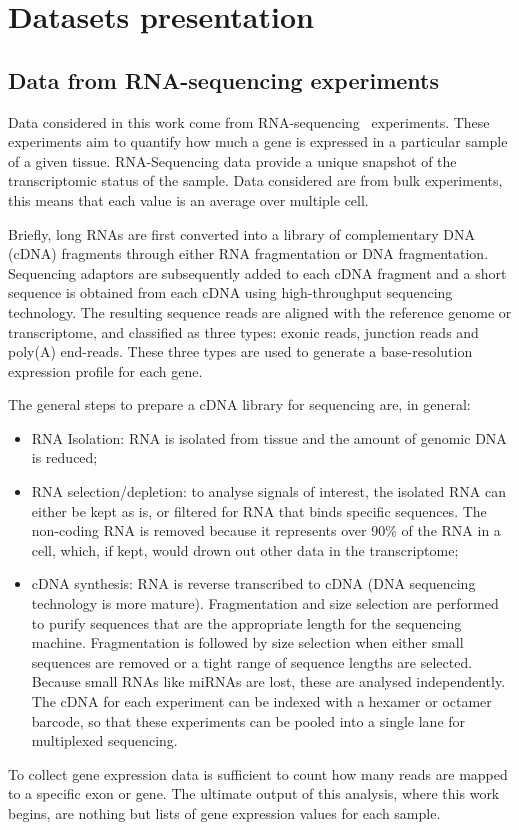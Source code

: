 \chapter{Datasets presentation}\label{ch:data}
\section{Data from RNA-sequencing experiments}\label{sec:rnaseq}
Data considered in this work come from RNA-sequencing~\cite{wang2009rna} experiments. These experiments aim to quantify how much a gene is expressed in a particular sample of a given tissue. RNA-Sequencing data provide a unique snapshot of the transcriptomic status of the sample. Data considered are from bulk experiments, this means that each value is an average over multiple cell.

Briefly, long RNAs are first converted into a library of complementary DNA (cDNA) fragments through either RNA fragmentation or DNA fragmentation. Sequencing adaptors are subsequently added to each cDNA fragment and a short sequence is obtained from each cDNA using high-throughput sequencing technology. The resulting sequence reads are aligned with the reference genome or transcriptome, and classified as three types: exonic reads, junction reads and poly(A) end-reads. These three types are used to generate a base-resolution expression profile for each gene.

The general steps to prepare a cDNA library for sequencing are, in general:
\begin{itemize}
\item RNA Isolation: RNA is isolated from tissue and the amount of genomic DNA is reduced;
\item RNA selection/depletion: to analyse signals of interest, the isolated RNA can either be kept as is, or filtered for RNA that binds specific sequences. The non-coding RNA is removed because it represents over 90$\%$ of the RNA in a cell, which, if kept, would drown out other data in the transcriptome;
\item cDNA synthesis: RNA is reverse transcribed to cDNA (DNA sequencing technology is more mature). Fragmentation and size selection are performed to purify sequences that are the appropriate length for the sequencing machine.  Fragmentation is followed by size selection when either small sequences are removed or a tight range of sequence lengths are selected. Because small RNAs like miRNAs are lost, these are analysed independently. The cDNA for each experiment can be indexed with a hexamer or octamer barcode, so that these experiments can be pooled into a single lane for multiplexed sequencing.
\end{itemize}
To collect gene expression data is sufficient to count how many reads are mapped to a specific exon or gene. The ultimate output of this analysis, where this work begins, are nothing but lists of gene expression values for each sample.
